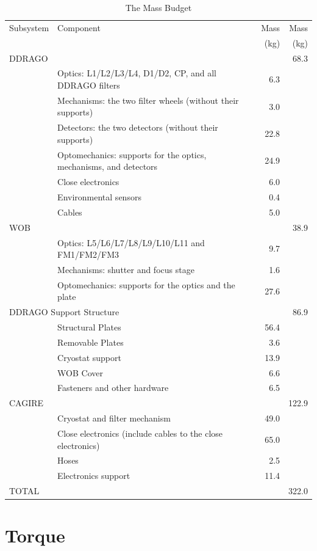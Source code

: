 \documentclass{report}
\begin{document}
\begin{table}
    \centering
    \begin{tabular}{llrr}
\hline
Subsystem&Component&Mass&Mass\\
&&(kg)&(kg)\\
\hline
\multicolumn{2}{l}{DDRAGO}&&68.3\\
&Optics: L1/L2/L3/L4, D1/D2, CP, and all DDRAGO filters&6.3\\
&Mechanisms: the two filter wheels (without their supports)&3.0\\
&Detectors: the two detectors (without their supports)&22.8\\
&Optomechanics: supports for the optics, mechanisms, and detectors&24.9\\
&Close electronics&6.0\\
&Environmental sensors&0.4\\
&Cables&5.0\\
\hline
\multicolumn{2}{l}{WOB}&&38.9\\
&Optics: L5/L6/L7/L8/L9/L10/L11 and FM1/FM2/FM3&9.7\\
&Mechanisms: shutter and focus stage&1.6\\
&Optomechanics: supports for the optics and the plate&27.6\\
\hline
\multicolumn{2}{l}{DDRAGO Support Structure}&&86.9\\
&Structural Plates&56.4\\
&Removable Plates&3.6\\
&Cryostat support&13.9\\
&WOB Cover&6.6\\
&Fasteners and other hardware&6.5\\
\hline
\multicolumn{2}{l}{CAGIRE}&&122.9\\
&Cryostat and filter mechanism&49.0\\
&Close electronics (include cables to the close electronics)&65.0\\
&Hoses&2.5\\
&Electronics support&11.4\\
\hline
\multicolumn{2}{l}{TOTAL}&&322.0\\
\hline
    \end{tabular}
    \caption{The Mass Budget}
    \label{table:mass-budget}
\end{table}

\section{Torque}
\end{document}
